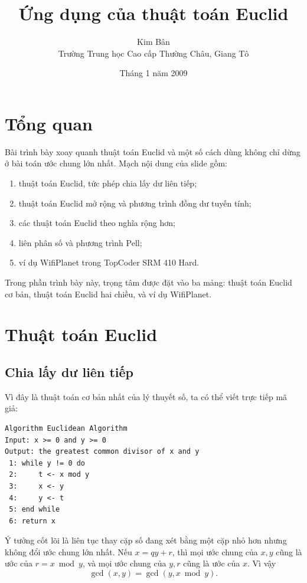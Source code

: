 \documentclass[11pt]{article}
\title{Ứng dụng của thuật toán Euclid}
\author{Kim Bân\\Trường Trung học Cao cấp Thường Châu, Giang Tô}
\date{Tháng 1 năm 2009}
\begin{document}
\maketitle


\section{Tổng quan}

Bài trình bày xoay quanh thuật toán Euclid và một số cách dùng không chỉ dừng
ở bài toán ước chung lớn nhất. Mạch nội dung của slide gồm:
\begin{enumerate}
  \item thuật toán Euclid, tức phép chia lấy dư liên tiếp;
  \item thuật toán Euclid mở rộng và phương trình đồng dư tuyến tính;
  \item các thuật toán Euclid theo nghĩa rộng hơn;
  \item liên phân số và phương trình Pell;
  \item ví dụ WifiPlanet trong TopCoder SRM 410 Hard.
\end{enumerate}

Trong phần trình bày này, trọng tâm được đặt vào ba mảng: thuật toán Euclid
cơ bản, thuật toán Euclid hai chiều, và ví dụ WifiPlanet.

\section{Thuật toán Euclid}

\subsection{Chia lấy dư liên tiếp}

Vì đây là thuật toán cơ bản nhất của lý thuyết số, ta có thể viết trực tiếp
mã giả:

\begin{verbatim}
Algorithm Euclidean Algorithm
Input: x >= 0 and y >= 0
Output: the greatest common divisor of x and y
 1: while y != 0 do
 2:     t <- x mod y
 3:     x <- y
 4:     y <- t
 5: end while
 6: return x
\end{verbatim}

Ý tưởng cốt lõi là liên tục thay cặp số đang xét bằng một cặp nhỏ hơn nhưng
không đổi ước chung lớn nhất. Nếu $x=qy+r$, thì mọi ước chung của $x,y$ cũng
là ước của $r=x\bmod y$, và mọi ước chung của $y,r$ cũng là ước của $x$. Vì
vậy
\[
  \gcd(x,y)=\gcd(y,x\bmod y).
\]
\end{document}
